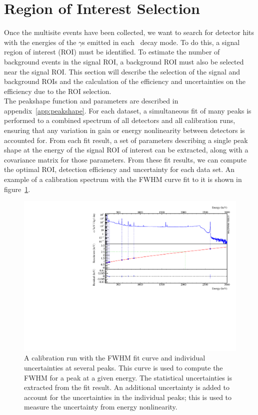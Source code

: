 \documentclass[/main.tex]{subfiles}
\begin{document}
\section{Region of Interest Selection}
Once the multisite events have been collected, we want to search for detector hits with the energies of the $\gamma$s emitted in each \bbes\ decay mode.
To do this, a signal region of interest (ROI) must be identified.
To estimate the number of background events in the signal ROI, a background ROI must also be selected near the signal ROI.
This section will describe the selection of the signal and background ROIs and the calculation of the efficiency and uncertainties on the efficiency due to the ROI selection.
\\
The peakshape function and parameters are described in appendix~\ref{app:peakshape}.
For each dataset, a simultaneous fit of many peaks is performed to a combined spectrum of all detectors and all calibration runs, ensuring that any variation in gain or energy nonlinearity between detectors is accounted for.
From each fit result, a set of parameters describing a single peak shape at the energy of the signal ROI of interest can be extracted, along with a covariance matrix for those parameters.
From these fit results, we can compute the optimal ROI, detection efficiency and uncertainty for each data set.
An example of a calibration spectrum with the FWHM curve fit to it is shown in figure~\ref{fig:fwhmcal}.
\begin{figure}[h]
  \centering
  \includegraphics[width=.9\linewidth]{fwhmcal}
  \caption[FWHM extracted from a  calibration spectrum]{\label{fig:fwhmcal}
    A  calibration run with the FWHM fit curve and individual uncertainties at several peaks. This curve is used to compute the FWHM for a peak at a given energy. The statistical uncertainties is extracted from the fit result. An additional uncertainty is added to account for the uncertainties in the individual peaks; this is used to measure the uncertainty from energy nonlinearity.
  }
\end{figure}
\\
\end{document}
